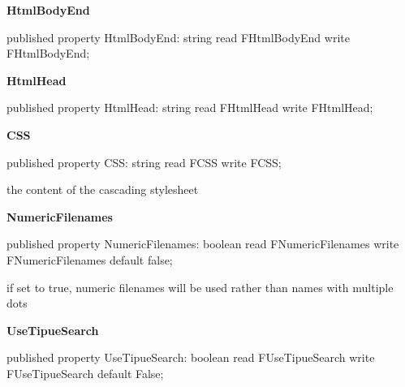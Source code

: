 \documentclass{report}
\newif\ifpdf
\begin{document}
\begin{list}{}
\begin{flushleft}
\ifpdf
\end{flushleft}
\fi


\par  \label{PasDoc_GenHtml.TGenericHTMLDocGenerator-HtmlBodyEnd}
\item[\textbf{HtmlBodyEnd}\hfill]
\ifpdf
\begin{flushleft}
\fi
\begin{ttfamily}
published property HtmlBodyEnd: string read FHtmlBodyEnd write FHtmlBodyEnd;\end{ttfamily}

\ifpdf
\end{flushleft}
\fi


\par  \label{PasDoc_GenHtml.TGenericHTMLDocGenerator-HtmlHead}
\item[\textbf{HtmlHead}\hfill]
\ifpdf
\begin{flushleft}
\fi
\begin{ttfamily}
published property HtmlHead: string read FHtmlHead write FHtmlHead;\end{ttfamily}

\ifpdf
\end{flushleft}
\fi


\par  \label{PasDoc_GenHtml.TGenericHTMLDocGenerator-CSS}
\item[\textbf{CSS}\hfill]
\ifpdf
\begin{flushleft}
\fi
\begin{ttfamily}
published property CSS: string read FCSS write FCSS;\end{ttfamily}

\ifpdf
\end{flushleft}
\fi


\par the content of the cascading stylesheet\label{PasDoc_GenHtml.TGenericHTMLDocGenerator-NumericFilenames}
\item[\textbf{NumericFilenames}\hfill]
\ifpdf
\begin{flushleft}
\fi
\begin{ttfamily}
published property NumericFilenames: boolean read FNumericFilenames write FNumericFilenames
      default false;\end{ttfamily}

\ifpdf
\end{flushleft}
\fi


\par if set to true, numeric filenames will be used rather than names with multiple dots\label{PasDoc_GenHtml.TGenericHTMLDocGenerator-UseTipueSearch}
\item[\textbf{UseTipueSearch}\hfill]
\ifpdf
\begin{flushleft}
\fi
\begin{ttfamily}
published property UseTipueSearch: boolean read FUseTipueSearch write FUseTipueSearch
      default False;\end{ttfamily}


\end{flushleft}
\end{list}
\end{document}
